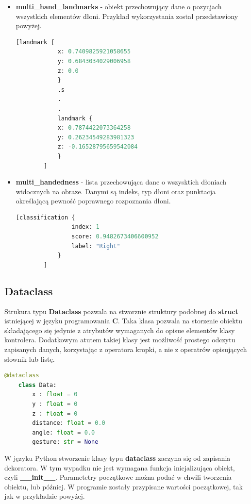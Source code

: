 \begin{itemize}
    \item \textbf{multi\_hand\_landmarks} - obiekt przechowujący dane o pozycjach wszystkich elementów dłoni. Przykład wykorzystania został przedstawiony powyżej. 
    
    \begin{lstlisting}[caption={Przykład elementu obiektu},captionpos=b,language=python]
        [landmark {
            x: 0.7409825921058655
            y: 0.6843034029006958
            z: 0.0
            }
            .s
            .
            .
            landmark {
            x: 0.7874422073364258
            y: 0.26234549283981323
            z: -0.16528795659542084
            }
        ]
    \end{lstlisting}
    

    \item \textbf{multi\_handedness} - lista przechowująca dane o wszysktich dłoniach widocznych na obraze. Danymi są indeks, typ dłoni oraz punktacja określającą pewność poprawnego rozpoznania dłoni. 
    \begin{lstlisting}[caption={Przykład elementu obiektu},captionpos=b,language=python]
        [classification {
                index: 1
                score: 0.9482673406600952
                label: "Right"
            }
        ]
    \end{lstlisting}
\end{itemize}

\subsection{Dataclass}

\quad Strukura typu \textbf{Dataclass} pozwala na stworznie struktury podobnej do \textbf{struct} istniejącej w języku programowania \textbf{C}. Taka klasa pozwala na storzenie obiektu składającego się jedynie z atrybutów wymaganych do opisue elementów klasy kontrolera. Dodatkowym atutem takiej klasy jest możliwość prostego odczytu zapisanych danych, korzystając z operatora kropki, a nie z operatrów opisujących słownik lub listę. 

\begin{lstlisting}[language=python]
    @dataclass
    class Data:
        x : float = 0
        y : float = 0
        z : float = 0
        distance: float = 0.0
        angle: float = 0.0
        gesture: str = None
\end{lstlisting}

\quad W języku Python stworzenie klasy typu \textbf{dataclass} zaczyna się od zapisania dekoratora. W tym wypadku nie jest wymagana funkcja inicjalizująca obiekt, czyli \textbf{\_\_init\_\_}. Parametetry początkowe można podać w chwili tworzenia obiektu, lub później. W programie zostały przypisane wartości początkowej, tak jak w przykładzie powyżej. 

